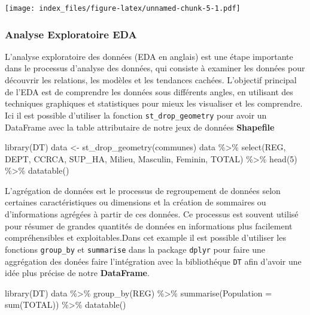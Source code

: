 \documentclass[
]{article}
\newenvironment{Shaded}{\begin{snugshade}}{\end{snugshade}}
\newcommand{\AttributeTok}[1]{\textcolor[rgb]{0.77,0.63,0.00}{#1}}
\newcommand{\DecValTok}[1]{\textcolor[rgb]{0.00,0.00,0.81}{#1}}
\newcommand{\FunctionTok}[1]{\textcolor[rgb]{0.00,0.00,0.00}{#1}}
\newcommand{\NormalTok}[1]{#1}
\newcommand{\OtherTok}[1]{\textcolor[rgb]{0.56,0.35,0.01}{#1}}
\newcommand{\SpecialCharTok}[1]{\textcolor[rgb]{0.00,0.00,0.00}{#1}}
\begin{document}
\texttt{[image: index\_files/figure-latex/unnamed-chunk-5-1.pdf]}

\hypertarget{analyse-exploratoire-eda}{%
\subsubsection{\texorpdfstring{Analyse Exploratoire
\textbf{EDA}}{Analyse Exploratoire EDA}}\label{analyse-exploratoire-eda}}

L'analyse exploratoire des données (EDA en anglais) est une étape
importante dans le processus d'analyse des données, qui consiste à
examiner les données pour découvrir les relations, les modèles et les
tendances cachées. L'objectif principal de l'EDA est de comprendre les
données sous différents angles, en utilisant des techniques graphiques
et statistiques pour mieux les visualiser et les comprendre. Ici il est
possible d'utiliser la fonction \texttt{st\_drop\_geometry} pour avoir
un DataFrame avec la table attributaire de notre jeux de données
\textbf{Shapefile}

\begin{Shaded}
\begin{Highlighting}[]
\FunctionTok{library}\NormalTok{(DT)}
\NormalTok{data }\OtherTok{\textless{}{-}} \FunctionTok{st\_drop\_geometry}\NormalTok{(communes)}
\NormalTok{data }\SpecialCharTok{\%\textgreater{}\%} \FunctionTok{select}\NormalTok{(REG, DEPT, CCRCA, SUP\_HA, Milieu, Masculin, Feminin, TOTAL) }\SpecialCharTok{\%\textgreater{}\%}
  \FunctionTok{head}\NormalTok{(}\DecValTok{5}\NormalTok{) }\SpecialCharTok{\%\textgreater{}\%} 
  \FunctionTok{datatable}\NormalTok{()}
\end{Highlighting}
\end{Shaded}

L'agrégation de données est le processus de regroupement de données
selon certaines caractéristiques ou dimensions et la création de
sommaires ou d'informations agrégées à partir de ces données. Ce
processus est souvent utilisé pour résumer de grandes quantités de
données en informations plus facilement compréhensibles et
exploitables.Dans cet example il est possible d'utiliser les fonctions
\texttt{group\_by} et \texttt{summarise} dans la package \texttt{dplyr}
pour faire une aggrégation des donées faire l'intégration avec la
bibliothéque \texttt{DT} afin d'avoir une idée plus précise de notre
\textbf{DataFrame}.

\begin{Shaded}
\begin{Highlighting}[]
\FunctionTok{library}\NormalTok{(DT)}
\NormalTok{data }\SpecialCharTok{\%\textgreater{}\%} 
  \FunctionTok{group\_by}\NormalTok{(REG) }\SpecialCharTok{\%\textgreater{}\%} 
  \FunctionTok{summarise}\NormalTok{(}\AttributeTok{Population =} \FunctionTok{sum}\NormalTok{(TOTAL)) }\SpecialCharTok{\%\textgreater{}\%} 
  \FunctionTok{datatable}\NormalTok{()}
\end{Highlighting}
\end{Shaded}
\end{document}
